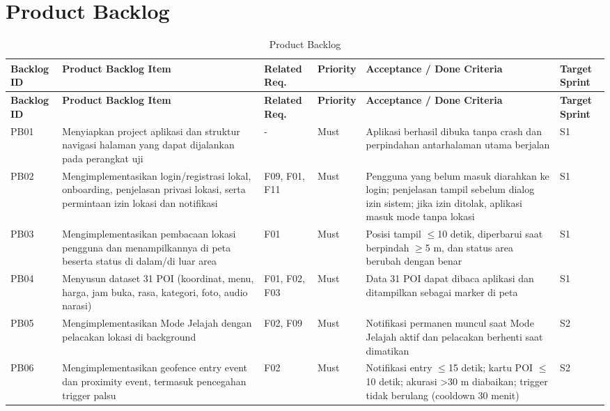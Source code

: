 \chapter{Product Backlog}
\label{bab:product-backlog}
\begin{longtable}{|L{0.118}|L{0.281}|L{0.172}|L{0.107}|L{0.208}|L{0.114}|}
\caption{Product Backlog}\\
\hline
{}\textbf{Backlog ID} & \textbf{Product Backlog Item} & \textbf{Related Req.} & \textbf{Priority} & \textbf{Acceptance / Done Criteria} & \textbf{Target Sprint} \\ \hline
\endfirsthead
\hline
{}\textbf{Backlog ID} & \textbf{Product Backlog Item} & \textbf{Related Req.} & \textbf{Priority} & \textbf{Acceptance / Done Criteria} & \textbf{Target Sprint} \\ \hline
\endhead
PB01 & Menyiapkan project aplikasi dan struktur navigasi halaman yang dapat dijalankan pada perangkat uji & - & Must & Aplikasi berhasil dibuka tanpa crash dan perpindahan antarhalaman utama berjalan & S1 \\ \hline
PB02 & Mengimplementasikan login/registrasi lokal, onboarding, penjelasan privasi lokasi, serta permintaan izin lokasi dan notifikasi & F09, F01, F11 & Must & Pengguna yang belum masuk diarahkan ke login; penjelasan tampil sebelum dialog izin sistem; jika izin ditolak, aplikasi masuk mode tanpa lokasi & S1 \\ \hline
PB03 & Mengimplementasikan pembacaan lokasi pengguna dan menampilkannya di peta beserta status di dalam/di luar area & F01 & Must & Posisi tampil \(\le\)10 detik, diperbarui saat berpindah \(\ge\)5 m, dan status area berubah dengan benar & S1 \\ \hline
PB04 & Menyusun dataset 31 POI (koordinat, menu, harga, jam buka, rasa, kategori, foto, audio narasi) & F01, F02, F03 & Must & Data 31 POI dapat dibaca aplikasi dan ditampilkan sebagai marker di peta & S1 \\ \hline
PB05 & Mengimplementasikan Mode Jelajah dengan pelacakan lokasi di background & F02, F09 & Must & Notifikasi permanen muncul saat Mode Jelajah aktif dan pelacakan berhenti saat dimatikan & S2 \\ \hline
PB06 & Mengimplementasikan geofence entry event dan proximity event, termasuk pencegahan trigger palsu & F02 & Must & Notifikasi entry \(\le\)15 detik; kartu POI \(\le\)10 detik; akurasi \textgreater{}30 m diabaikan; trigger tidak berulang (cooldown 30 menit) & S2 \\ \hline

\end{longtable}
